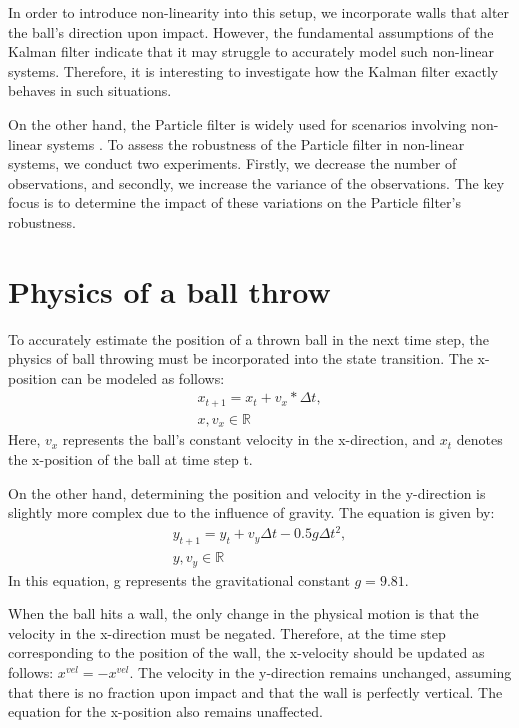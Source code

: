 \documentclass[conference]{IEEEtran}
\begin{document}
In order to introduce non-linearity into this setup, we incorporate walls that alter the ball's direction upon impact.
However, the fundamental assumptions of the Kalman filter indicate that it may struggle to accurately model such non-linear systems.
Therefore, it is interesting to investigate how the Kalman filter exactly behaves in such situations. 

On the other hand, the Particle filter is widely used for scenarios involving non-linear systems \cite{b3}.
To assess the robustness of the Particle filter in non-linear systems, we conduct two experiments.
Firstly, we decrease the number of observations, and secondly, we increase the variance of the observations.
The key focus is to determine the impact of these variations on the Particle filter's robustness.


\section{Physics of a ball throw}


To accurately estimate the position of a thrown ball in the next time step, the physics of ball throwing must be incorporated into the state transition.
The x-position can be modeled as follows:
\begin{equation*}
    \begin{aligned}
    x_{t+1} = x_{t} + v_x * \Delta t,   \\
    x, v_x \in \mathbb{R}
    \end{aligned}
    \tag{1}
\end{equation*}
Here, ${v_x}$ represents the ball's constant velocity in the x-direction, and $x_t$ denotes the x-position of the ball at time step t.

On the other hand, determining the position and velocity in the y-direction is slightly more complex due to the influence of gravity. 
The equation is given by:
\begin{equation*}
    \begin{aligned}
    y_{t+1} = y_t + v_y \Delta t - 0.5 g \Delta t^2, \\
    y, v_y \in \mathbb{R}
    \end{aligned}
    \tag{2}
\end{equation*}
In this equation, g represents the gravitational constant $g = 9.81$.

When the ball hits a wall, the only change in the physical motion is that the velocity in the x-direction must be negated.
Therefore, at the time step corresponding to the position of the wall, the x-velocity should be updated as follows: $x^{vel} = -x^{vel}$.
The velocity in the y-direction remains unchanged, assuming that there is no fraction upon impact and that the wall is perfectly vertical.
The equation for the x-position also remains unaffected.
\end{document}
